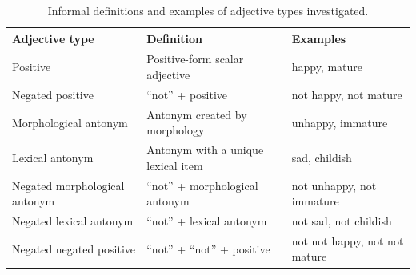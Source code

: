 \documentclass[floatsintext,doc]{apa6}
\begin{document}





%
%

\begin{table}[b]
\centering
\begingroup\fontsize{10pt}{11pt}\selectfont
\begin{tabularx}{\textwidth}{lll}
  \hline
 Adjective type & Definition & Examples \\ 
  \hline
 Positive & Positive-form scalar adjective & happy, mature \\ 
  Negated positive &  ``not'' + positive & not happy, not mature \\ 
  Morphological antonym &  Antonym created by morphology & unhappy, immature \\ 
  Lexical antonym & Antonym with a unique lexical item & sad, childish \\ 
  Negated morphological antonym &  ``not'' + morphological antonym & not unhappy, not immature \\ 
  Negated lexical antonym   &  ``not'' +  lexical antonym & not sad, not childish \\ 
  Negated negated positive  &  ``not'' + ``not'' + positive & not not happy, not not mature \\ 
   \hline
\end{tabularx}
\endgroup
\caption{Informal definitions and examples of adjective types investigated.} 
\end{table}
\end{document}

